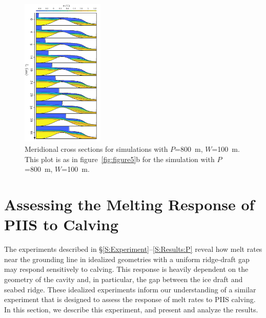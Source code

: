 \documentclass[draft]{agujournal2019}
\begin{document}
\begin{figure}
    \centering
    \includegraphics[width = 0.35\textwidth]{../make_figures/plots/figure9_axislabel.pdf}
    \caption{Meridional cross sections for simulations with $P$=800~m, $W$=100~m. This plot is as in figure~\ref{fig:figure5}b for the simulation with $P$=800~m, $W$=100~m. }
    \label{fig:figure9}
\end{figure}

\section{Assessing the Melting Response of PIIS to Calving}\label{S:Realistic}
The experiments described in \S\ref{S:Experiment}--\ref{S:Results:P} reveal how melt rates near the grounding line in idealized geometries with a uniform ridge-draft gap may respond sensitively to calving. This response is heavily dependent on the geometry of the cavity and, in particular, the gap between the ice draft and seabed ridge. These idealized experiments inform our understanding of a similar experiment that is designed to assess the response of melt rates to PIIS calving. In this section, we describe this experiment, and present and analyze the results.
\end{document}

